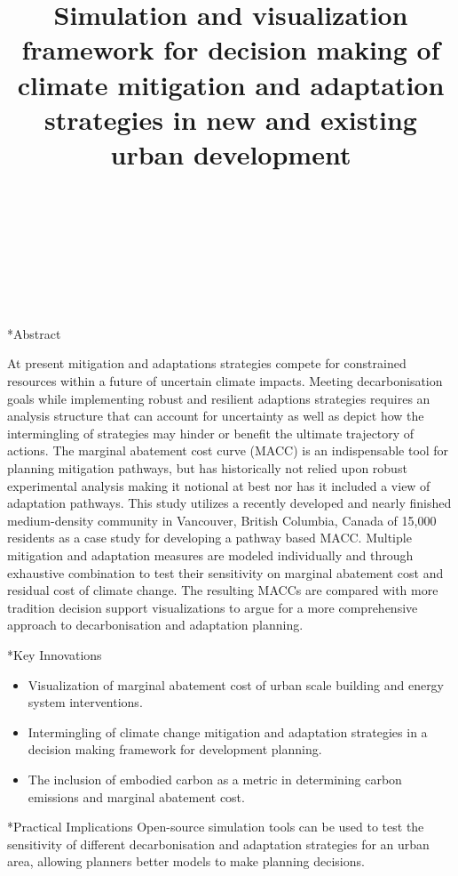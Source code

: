 \documentclass[twocolumn, a4paper,10pt]{article}
\title{%
Simulation and visualization framework for decision making of climate mitigation  																								%
\vspace{4pt}
and adaptation strategies in new and existing urban development} 																																%
\author{																																														%
\\ 																				%
\\ 																																                                                            	%
\\ 																																                                                                %
\\ 			 			  	                                                    %
\\ 														                    	%
\phantom{Line 9}} 																																								            	%
\date{\vspace{-0.5cm}}	%
\makeatletter
\renewcommand\section{\@startsection{section}{1}{\z@}{3pt}{3pt}{\normalfont\large\bfseries}}
\makeatother
\begin{document}
\maketitle

\section*{Abstract}	%
\addtocounter{section}{1}
At present mitigation and adaptations strategies compete for constrained resources within a future of uncertain climate impacts. Meeting decarbonisation goals while implementing robust and resilient adaptions strategies requires an analysis structure that can account for uncertainty as well as depict how the intermingling of strategies may hinder or benefit the ultimate trajectory of actions. The marginal abatement cost curve (MACC) is an indispensable tool for planning mitigation pathways, but has historically not relied upon robust experimental analysis making it notional at best nor has it included a view of adaptation pathways. This study utilizes a recently developed and nearly finished medium-density community in Vancouver, British Columbia, Canada of 15,000 residents as a case study for developing a pathway based MACC. Multiple mitigation and adaptation measures are modeled individually and through exhaustive combination to test their sensitivity on marginal abatement cost and residual cost of climate change. The resulting MACCs are compared with more tradition decision support visualizations to argue for a more comprehensive approach to decarbonisation and adaptation planning. 

\section*{Key Innovations}
\begin{itemize}
\item Visualization of marginal abatement cost of urban scale building and energy system interventions.
\item Intermingling of climate change mitigation and adaptation strategies in a decision making framework for development planning.
\item The inclusion of embodied carbon as a metric in determining carbon emissions and marginal abatement cost.
\end{itemize}

\section*{Practical Implications}
Open-source simulation tools can be used to test the sensitivity of different decarbonisation and adaptation strategies for an urban area, allowing planners better models to make planning decisions. 
\end{document}
